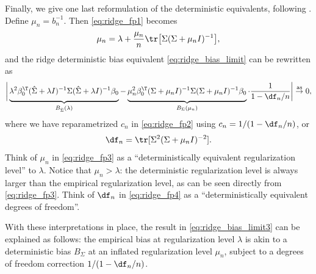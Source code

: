 \documentclass{article}
\begin{document}
Finally, we give one last reformulation of the deterministic equivalents,
following \citet{lejeune2022asymptotics, bach2023high}. Define $\mu_n =
b_n^{-1}$. Then \eqref{eq:ridge_fp1} becomes 
\begin{equation}
\label{eq:ridge_fp3}
\mu_n = \lambda + \frac{\mu_n}{n} \tr \big[ \Sigma (\Sigma + \mu_n I)^{-1}
\big], 
\end{equation}
and the ridge deterministic bias equivalent \eqref{eq:ridge_bias_limit} can be
rewritten as
\begin{equation}
\label{eq:ridge_bias_limit3}
\bigg| \underbrace{ \lambda^2 \beta_0^\T (\hSigma + \lambda I)^{-1} \Sigma  
  (\hSigma + \lambda I)^{-1} \beta_0 \vphantom{ \Big] } }_{B_{\hSigma}(\lambda)}
- \underbrace{ \mu_n^2 \beta_0^\T(\Sigma + \mu_n I)^{-1} \Sigma (\Sigma + \mu_n
  I)^{-1} \beta_0 \vphantom{ \Big] }}_{B_\Sigma(\mu_n)} \cdot \frac{1}{1 - \df_n
  / n} \bigg| \asto 0,      
\end{equation}
where we have reparametrized $c_n$ in \eqref{eq:ridge_fp2} using $c_n = 1 / (1 -
\df_n / n)$, or 
\begin{equation}
\label{eq:ridge_fp4}
\df_n = \tr [ \Sigma^2 (\Sigma + \mu_n I)^{-2} ].
\end{equation}
Think of $\mu_n$ in \eqref{eq:ridge_fp3} as a ``deterministically equivalent
regularization level'' to $\lambda$. Notice that $\mu_n > \lambda$: the
deterministic regularization level is always larger than the empirical
regularization level, as can be seen directly from \eqref{eq:ridge_fp3}. Think
of $\df_n$ in \eqref{eq:ridge_fp4} as a ``deterministically equivalent degrees
of freedom''.   

With these interpretations in place, the result in \eqref{eq:ridge_bias_limit3}
can be explained as follows: the empirical bias  at
regularization level $\lambda$ is akin to a deterministic bias $B_\Sigma$ at an
inflated regularization level $\mu_n$, subject to a degrees of freedom
correction $1 / (1 - \df_n / n)$.  



\end{document}
